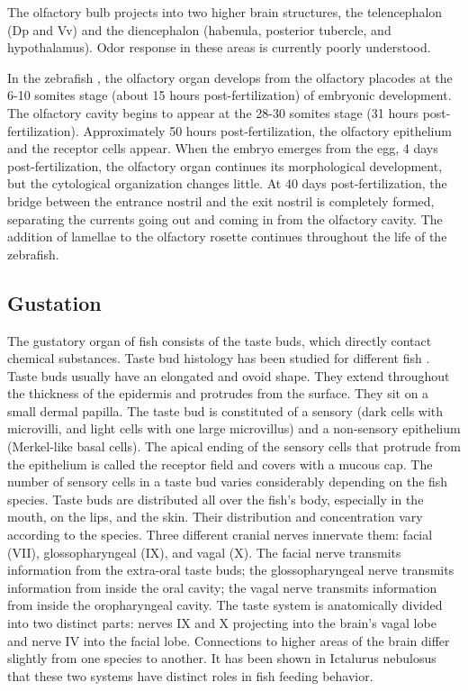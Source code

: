    The olfactory bulb projects into two higher brain structures, the telencephalon (Dp and Vv) and the diencephalon (habenula, posterior tubercle, and hypothalamus). Odor response in these areas is currently poorly understood.

    In the zebrafish \cite{hansen1993development,miyasaka2013functional}, the olfactory organ develops from the olfactory placodes at the 6-10 somites stage (about 15 hours post-fertilization) of embryonic development. The olfactory cavity begins to appear at the 28-30 somites stage (31 hours post-fertilization). Approximately 50 hours post-fertilization, the olfactory epithelium and the receptor cells appear. When the embryo emerges from the egg, 4 days post-fertilization, the olfactory organ continues its morphological development, but the cytological organization changes little. At 40 days post-fertilization, the bridge between the entrance nostril and the exit nostril is completely formed, separating the currents going out and coming in from the olfactory cavity. The addition of lamellae to the olfactory rosette continues throughout the life of the zebrafish.

    \subsection{Gustation}
    The gustatory organ of fish consists of the taste buds, which directly contact chemical substances.
    Taste bud histology has been studied for different fish \cite{kapoor1976gustatory,fishelson2004taste,reutter2000heterogeneity,reutter1991ultrastructure,reutter2012taste}. Taste buds usually have an elongated and ovoid shape. They extend throughout the thickness of the epidermis and protrudes from the surface. They sit on a small dermal papilla. The taste bud is constituted of a sensory (dark cells with microvilli, and light cells with one large microvillus) and a non-sensory epithelium (Merkel‐like basal cells). The apical ending of the sensory cells that protrude from the epithelium is called the receptor field and covers with a mucous cap. The number of sensory cells in a taste bud varies considerably depending on the fish species.
    Taste buds are distributed all over the fish's body, especially in the mouth, on the lips, and the skin. Their distribution and concentration vary according to the species. Three different cranial nerves innervate them: facial (VII), glossopharyngeal (IX), and vagal (X). The facial nerve transmits information from the extra-oral taste buds; the glossopharyngeal nerve transmits information from inside the oral cavity; the vagal nerve transmits information from inside the oropharyngeal cavity. The taste system is anatomically divided into two distinct parts: nerves IX and X projecting into the brain's vagal lobe and nerve IV into the facial lobe. Connections to higher areas of the brain differ slightly from one species to another. It has been shown in Ictalurus nebulosus \cite{datema1971structures} that these two systems have distinct roles in fish feeding behavior.

